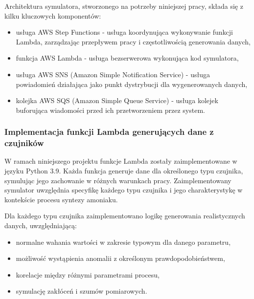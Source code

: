 Architektura symulatora, stworzonego na potrzeby niniejszej pracy, składa się z kilku kluczowych komponentów:

\begin{itemize}
    \item usługa AWS Step Functions - usługa koordynująca wykonywanie funkcji Lambda, zarządzając przepływem pracy i częstotliwością generowania danych,
    \item funkcja AWS Lambda \cite{aws_lambda_docs} - usługa bezserwerowa wykonująca kod symulatora,
    \item usługa AWS SNS (Amazon Simple Notification Service) \cite{sns_docs} - usługa powiadomień działająca jako punkt dystrybucji dla wygenerowanych danych,
    \item kolejka AWS SQS (Amazon Simple Queue Service) \cite{sqs_docs} - usługa kolejek buforująca wiadomości przed ich przetworzeniem przez system.
\end{itemize}

%

\subsubsection{Implementacja funkcji Lambda generujących dane z czujników}
\label{subsubsec:implementacja_lambda}

W ramach niniejszego projektu funkcje Lambda zostały zaimplementowane w języku Python 3.9. Każda funkcja generuje dane dla określonego typu czujnika,
symulując jego zachowanie w różnych warunkach pracy. Zaimplementowany symulator uwzględnia specyfikę każdego typu czujnika i jego charakterystykę w kontekście procesu syntezy amoniaku.

\vspace{0.3em}

Dla każdego typu czujnika zaimplementowano logikę generowania realistycznych danych, uwzględniającą:
\begin{itemize}
    \item normalne wahania wartości w zakresie typowym dla danego parametru,
    \item możliwość wystąpienia anomalii z określonym prawdopodobieństwem,
    \item korelacje między różnymi parametrami procesu,
    \item symulację zakłóceń i szumów pomiarowych.
\end{itemize}